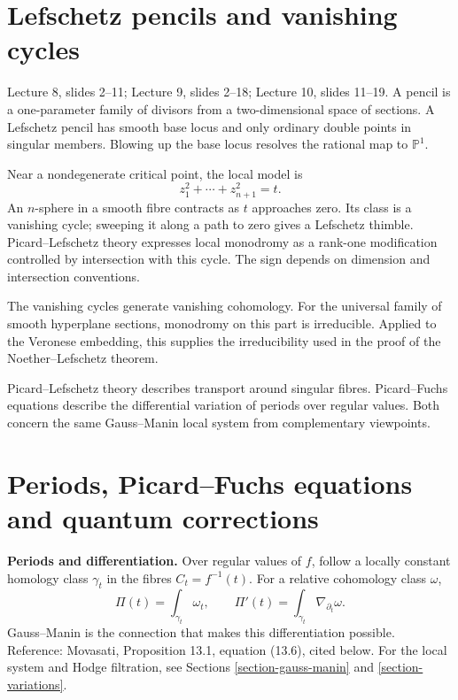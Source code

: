 \section{Lefschetz pencils and vanishing
cycles}
\label{section-vanishing-cycles}

Lecture 8, slides 2--11;
Lecture 9, slides 2--18;
Lecture 10, slides 11--19.
A pencil is a one-parameter family of
divisors from a two-dimensional space of
sections. A Lefschetz pencil has smooth
base locus and only ordinary double
points in singular members. Blowing up
the base locus resolves the rational map
to $\mathbb P^1$.

Near a nondegenerate critical point,
the local model is
$$
z_1^2+\cdots+z_{n+1}^2=t.
$$
An $n$-sphere in a smooth fibre contracts
as $t$ approaches zero. Its class is a
vanishing cycle; sweeping it along a path
to zero gives a Lefschetz thimble.
Picard--Lefschetz theory expresses local
monodromy as a rank-one modification
controlled by intersection with this
cycle. The sign depends on dimension
and intersection conventions.

The vanishing cycles generate vanishing
cohomology. For the universal family of
smooth hyperplane sections, monodromy on
this part is irreducible. Applied to the
Veronese embedding, this supplies the
irreducibility used in the proof of the
Noether--Lefschetz theorem.

Picard--Lefschetz theory describes transport
around singular fibres. Picard--Fuchs
equations describe the differential
variation of periods over regular values.
Both concern the same Gauss--Manin local
system from complementary viewpoints.

\section{Periods, Picard--Fuchs equations
and quantum corrections}
\label{section-quantum-periods-background}

\noindent
{\bf Periods and differentiation.}
Over regular values of $f$, follow a
locally constant homology class
$\gamma_t$ in the fibres $C_t=f^{-1}(t)$.
For a relative cohomology class $\omega$,
$$
\Pi(t)=\int_{\gamma_t}\omega_t,
\qquad
\Pi'(t)=\int_{\gamma_t}\nabla_{\partial_t}
\omega.
$$
Gauss--Manin is the connection that
makes this differentiation possible.
Reference: Movasati, Proposition 13.1,
equation (13.6), cited below.
For the local system and Hodge filtration,
see Sections \ref{section-gauss-manin}
and \ref{section-variations}.

